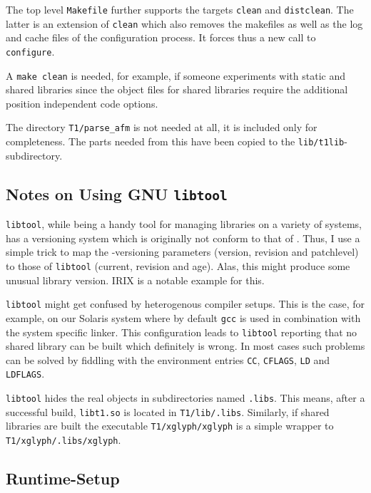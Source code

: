 The top level \verb+Makefile+ further supports the targets \verb+clean+ and
\verb+distclean+. The latter is an extension of \verb+clean+ which also
removes the makefiles as well as the log and cache files of the configuration
process. It forces thus a new call to \verb+configure+. 

A \verb+make clean+ is needed, for example, if someone experiments with static
and shared libraries since the object files for shared libraries require the
additional position independent code options.

The directory \verb+T1/parse_afm+ is not needed at all, it is included only
for completeness. The parts needed from this have been copied to the
\verb+lib/t1lib+-subdirectory. 


\subsection{Notes on Using GNU {\tt libtool}}
\label{libtoolproblems}%
\verb+libtool+, while being a handy tool for managing libraries on a variety
of systems, has a versioning system which is originally not conform to that of
\tonelib. Thus, I use a simple trick to map the \tonelib-versioning parameters
(version, revision and patchlevel) to those of \verb+libtool+ (current,
revision and age). Alas, this might produce some unusual library version. IRIX
is a notable example for this.

\verb+libtool+ might get confused by heterogenous compiler setups. This is the
case, for example, on our Solaris system where by default \verb+gcc+ is used
in combination with the system specific linker. This configuration leads to
\verb+libtool+ reporting that no shared library can be built which definitely
is wrong. In most cases such problems can be solved by fiddling with the
environment entries \verb+CC+, \verb+CFLAGS+, \verb+LD+ and \verb+LDFLAGS+.

\verb+libtool+ hides the real objects in subdirectories named \verb+.libs+.
This means, after a successful build, \verb+libt1.so+ is located in
\verb+T1/lib/.libs+. Similarly, if shared libraries are built the executable
\verb+T1/xglyph/xglyph+ is a simple wrapper to \verb+T1/xglyph/.libs/xglyph+. 


\subsection{Runtime-Setup}
\label{runtimesetup}%
